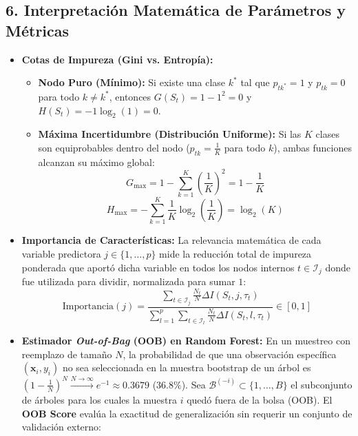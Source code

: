 \documentclass[11pt, a4paper]{article}
\begin{document}
\subsection*{6. Interpretación Matemática de Parámetros y Métricas}
\begin{itemize}
    \item \textbf{Cotas de Impureza (Gini vs. Entropía):}
    \begin{itemize}
        \item \textbf{Nodo Puro (Mínimo):} Si existe una clase $k^*$ tal que $p_{tk^*} = 1$ y $p_{tk} = 0$ para todo $k \neq k^*$, entonces $G(S_t) = 1 - 1^2 = 0$ y $H(S_t) = -1 \log_2(1) = 0$.
        \item \textbf{Máxima Incertidumbre (Distribución Uniforme):} Si las $K$ clases son equiprobables dentro del nodo ($p_{tk} = \frac{1}{K}$ para todo $k$), ambas funciones alcanzan su máximo global:
        \begin{equation}
            G_{\max} = 1 - \sum_{k=1}^{K} \left(\frac{1}{K}\right)^2 = 1 - \frac{1}{K}
        \end{equation}
        \begin{equation}
            H_{\max} = -\sum_{k=1}^{K} \frac{1}{K}\log_2\left(\frac{1}{K}\right) = \log_2(K)
        \end{equation}
    \end{itemize}
    \item \textbf{Importancia de Características:} La relevancia matemática de cada variable predictora $j \in \{1, \dots, p\}$  mide la reducción total de impureza ponderada que aportó dicha variable en todos los nodos internos $t \in \mathcal{I}_j$ donde fue utilizada para dividir, normalizada para sumar $1$:
    \begin{equation}
        \text{Importancia}(j) = \frac{\sum_{t \in \mathcal{I}_j} \frac{N_t}{N} \Delta I(S_t, j, \tau_t)}{\sum_{l=1}^{p} \sum_{t \in \mathcal{I}_l} \frac{N_t}{N} \Delta I(S_t, l, \tau_t)} \in [0, 1]
    \end{equation}
    \item \textbf{Estimador \textit{Out-of-Bag} (OOB) en Random Forest:} En un muestreo con reemplazo de tamaño $N$, la probabilidad de que una observación específica $(\mathbf{x}_i, y_i)$ no sea seleccionada en la muestra bootstrap de un árbol es $\left(1 - \frac{1}{N}\right)^N \xrightarrow{N \to \infty} e^{-1} \approx 0.3679$ ($36.8\%$). Sea $\mathcal{B}^{(-i)} \subset \{1, \dots, B\}$ el subconjunto de árboles para los cuales la muestra $i$ quedó fuera de la bolsa (OOB). El \textbf{OOB Score} evalúa la exactitud de generalización sin requerir un conjunto de validación externo:

\end{itemize}
\end{document}
